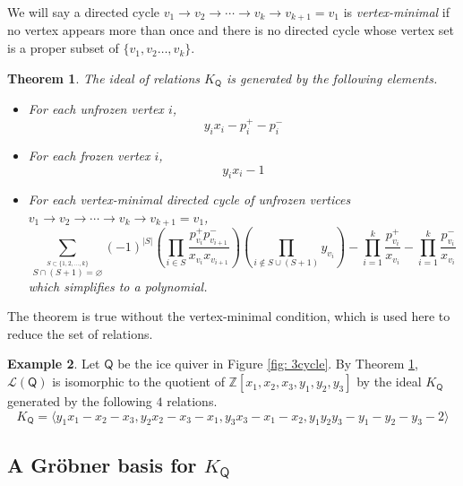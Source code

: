 \documentclass[10pt]{amsart}
\numberwithin{equation}{section}
\newtheorem{thm}{Theorem}[section]
\theoremstyle{definition}
\newtheorem{ex}[thm]{Example}
\theoremstyle{remark}
\renewcommand{\L}{\mathcal{L}}%
\renewcommand{\emptyset}{\varnothing}
\newcommand{\1}{^{-1}}
\def\ZZ{\mathbb{Z}}
\def\Q{\mathsf{Q}}
\begin{document}
We will say a directed cycle $v_1\rightarrow v_2 \rightarrow \cdots \rightarrow v_k\rightarrow v_{k+1}=v_1$ is \textit{vertex-minimal} if no vertex appears more than once and there is no directed cycle whose vertex set is a proper subset of $\{v_1,v_2\dots,v_k\}$.

\begin{thm}\label{thm: relations}
The ideal of relations $K_\Q$ is generated by the following elements.
\begin{itemize}
	\item For each unfrozen vertex $i$, 
\begin{equation}\label{eq: mutationrel}
y_ix_i - p_i^+-p_i^-
\end{equation}
	\item For each frozen vertex $i$, 
\begin{equation}\label{eq: inverserel}
y_ix_i-1 
\end{equation}
	\item For each vertex-minimal %
	directed cycle of unfrozen vertices $v_1\rightarrow v_2 \rightarrow \cdots \rightarrow v_k\rightarrow v_{k+1}=v_1$,
\begin{equation}%
\sum_{\stackrel{S\subset \{1,2,\dots,k\}}{S\cap (S+1)=\emptyset}} (-1)^{|S|}\left(\prod_{i\in S} \frac{p_{v_i}^+p_{v_{i+1}}^-}{x_{v_i}x_{v_{i+1}}}\right)\left(\prod_{i\not\in S\cup (S+1)} y_{v_i}\right) - \prod_{i=1}^k\frac{p_{v_i}^+}{x_{v_i}}- \prod_{i=1}^k\frac{p_{v_i}^-}{x_{v_i}}
\end{equation}
which simplifies to a polynomial.
\end{itemize}
\end{thm}
\noindent The theorem is true without the vertex-minimal condition, which is used here to reduce the set of relations.

\begin{ex}\label{ex:3vertexgrobner}
Let $\Q$ be the ice quiver in Figure \ref{fig: 3cycle}.  By Theorem \ref{thm: relations}, $\L(\Q)$ is isomorphic to the quotient of $\ZZ[x_1,x_2,x_3,y_1,y_2,y_3]$ by the ideal $K_\Q$ generated by the following $4$ relations.
\[ K_\Q =\langle y_1x_1-x_2-x_3,y_2 x_2-x_3-x_1, y_3x_3-x_1-x_2, y_1y_2y_3-y_1-y_2-y_3-2\rangle \]
\end{ex}

\subsection{A Gr\"obner basis for $K_\Q$}
\end{document}
